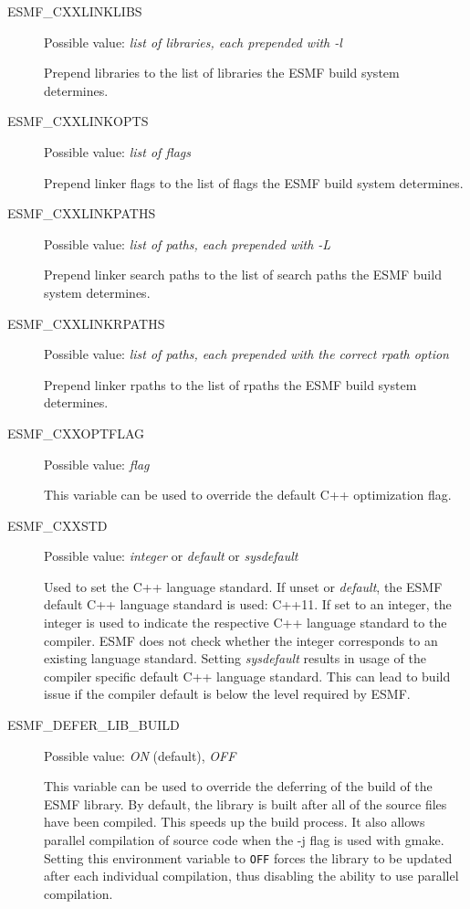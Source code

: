 \begin{description}
\item[ESMF\_CXXLINKLIBS]
Possible value: {\em list of libraries, each prepended with -l}

Prepend libraries to the list of libraries the ESMF build system determines.

\item[ESMF\_CXXLINKOPTS]
Possible value: {\em list of flags}

Prepend linker flags to the list of flags the ESMF build system determines.

\item[ESMF\_CXXLINKPATHS]
Possible value: {\em list of paths, each prepended with -L}

Prepend linker search paths to the list of search paths the ESMF build system
determines.

\item[ESMF\_CXXLINKRPATHS]
Possible value: {\em list of paths, each prepended with the correct rpath option}

Prepend linker rpaths to the list of rpaths the ESMF build system determines.

\item[ESMF\_CXXOPTFLAG]
Possible value: {\em flag}

This variable can be used to override the default C++ optimization flag.

\item[ESMF\_CXXSTD]
Possible value: {\em integer} or {\em default} or {\em sysdefault}

Used to set the C++ language standard. If unset or {\em default}, the ESMF default C++ language standard is used: C++11.
If set to an integer, the integer is used to indicate the respective C++ language standard to the compiler. ESMF does not check whether the integer corresponds to an existing language standard.
Setting {\em sysdefault} results in usage of the compiler specific default C++ language standard. This can lead to build issue if the compiler default is below the level required by ESMF.

\item[ESMF\_DEFER\_LIB\_BUILD]
Possible value: {\em ON} (default), {\em OFF}

This variable can be used to override the deferring of the build of the
ESMF library.  By default, the library is built after all of the source
files have been compiled.  This speeds up the build process. It also
allows parallel compilation of source code when the -j flag is used with
gmake.  Setting this environment variable to {\tt OFF} forces the library to
be updated after each individual compilation, thus disabling the ability
to use parallel compilation.


\end{description}
